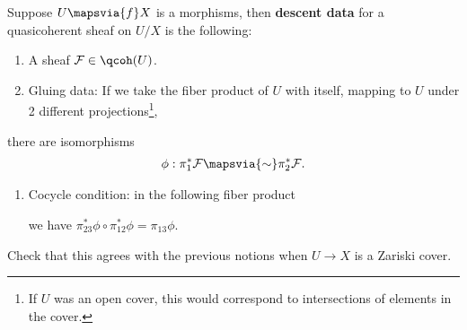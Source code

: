 \begin{definition}

Suppose \(U\mapsvia{f}X\) is a morphisms, then \textbf{descent data} for
a quasicoherent sheaf on \(U/X\) is the following:

\begin{enumerate}
\def\labelenumi{\arabic{enumi}.}
\tightlist
\item
  A sheaf \(\mathcal{F}\in \qcoh(U)\).
\item
  Gluing data: If we take the fiber product of \(U\) with itself,
  mapping to \(U\) under 2 different projections\footnote{If \(U\) was
    an open cover, this would correspond to intersections of elements in
    the cover.},
\end{enumerate}

\begin{center}
\end{center}

there are isomorphisms
\begin{align*}  
  \phi: \pi_1^* \mathcal{F} \mapsvia{\sim} \pi_2^* \mathcal{F}
  .\end{align*}

\begin{enumerate}
\def\labelenumi{\arabic{enumi}.}
\setcounter{enumi}{2}
\tightlist
\item
  Cocycle condition: in the following fiber product

  \begin{center}
  \end{center}

  we have \(\pi_{23}^* \phi \circ \pi_{12}^* \phi = \pi_{13}\phi\).
\end{enumerate}

\end{definition}

\begin{exercise}[?]

Check that this agrees with the previous notions when \(U\to X\) is a
Zariski cover.

\end{exercise}

